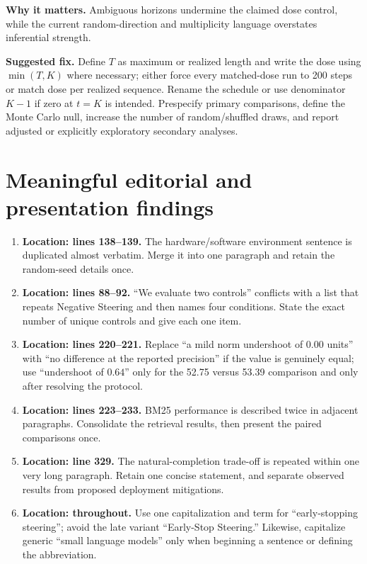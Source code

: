 \documentclass[11pt]{article}
\newcommand{\status}[1]{\textbf{#1}}
\begin{document}
\status{Why it matters.} Ambiguous horizons undermine the claimed dose control, while the current random-direction and multiplicity language overstates inferential strength.

\status{Suggested fix.} Define $T$ as maximum or realized length and write the dose using $\min(T,K)$ where necessary; either force every matched-dose run to 200 steps or match dose per realized sequence.  Rename the schedule or use denominator $K-1$ if zero at $t=K$ is intended.  Prespecify primary comparisons, define the Monte Carlo null, increase the number of random/shuffled draws, and report adjusted or explicitly exploratory secondary analyses.

\section*{Meaningful editorial and presentation findings}

\begin{enumerate}
    \item \status{Location: lines 138--139.} The hardware/software environment sentence is duplicated almost verbatim.  Merge it into one paragraph and retain the random-seed details once.
    \item \status{Location: lines 88--92.} ``We evaluate two controls'' conflicts with a list that repeats Negative Steering and then names four conditions.  State the exact number of unique controls and give each one item.
    \item \status{Location: lines 220--221.} Replace ``a mild norm undershoot of $0.00$ units'' with ``no difference at the reported precision'' if the value is genuinely equal; use ``undershoot of $0.64$'' only for the 52.75 versus 53.39 comparison and only after resolving the protocol.
    \item \status{Location: lines 223--233.} BM25 performance is described twice in adjacent paragraphs.  Consolidate the retrieval results, then present the paired comparisons once.
    \item \status{Location: line 329.} The natural-completion trade-off is repeated within one very long paragraph.  Retain one concise statement, and separate observed results from proposed deployment mitigations.
    \item \status{Location: throughout.} Use one capitalization and term for ``early-stopping steering''; avoid the late variant ``Early-Stop Steering.''  Likewise, capitalize generic ``small language models'' only when beginning a sentence or defining the abbreviation.
\end{enumerate}
\end{document}
